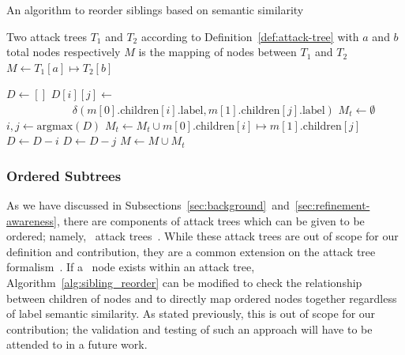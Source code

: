 \begin{algorithm}
    \caption{An algorithm to reorder siblings based on semantic similarity}
    \label{alg:sibling_reorder}
    \begin{algorithmic}
        \State Two attack trees $T_1$ and $T_2$ according to Definition~\ref{def:attack-tree} with $a$ and $b$ total nodes respectively
        \State $M$ is the mapping of nodes between $T_1$ and $T_2$ 
        \State $M \gets T_1[a]\mapsto T_2[b]$

        \State $D \gets []$ 
        \State $D[i][j] \gets$
        \State$\text{  }\text{  }\text{  }\text{  }\text{  }\text{  }\text{  }\text{  }\text{  }\delta(m[0].\text{children}[i].\text{label}, m[1].\text{children}[j].\text{label})$
        \EndFor
        \EndFor
        \State $M_t \gets \emptyset$ 
        \State $i, j \gets \text{argmax}(D)$ 
        \State $M_t \gets M_t \cup m[0].\text{children}[i]\mapsto m[1].\text{children}[j]$
        \State $D \gets D - i$ 
        \State $D \gets D - j$ 
        \EndWhile
        \EndIf
        \EndFor
        \State $M \gets M \cup M_t$
        \EndFor
    \end{algorithmic}
\end{algorithm}


\subsubsection{Ordered Subtrees}

As we have discussed in Subsections~\ref{sec:background}~and~\ref{sec:refinement-awareness}, there are components of attack trees which can be given to be ordered; namely, \SAND\ attack trees~\cite{jhawar_attack_2015}. While these attack trees are out of scope for our definition and contribution, they are a common extension on the attack tree formalism~\cite{lallieReviewAttackGraph2020}. If a \SAND\ node exists within an attack tree, Algorithm~\ref{alg:sibling_reorder} can be modified to check the relationship between children of nodes and to directly map ordered nodes together regardless of label semantic similarity. As stated previously, this is out of scope for our contribution; the validation and testing of such an approach will have to be attended to in a future work.
